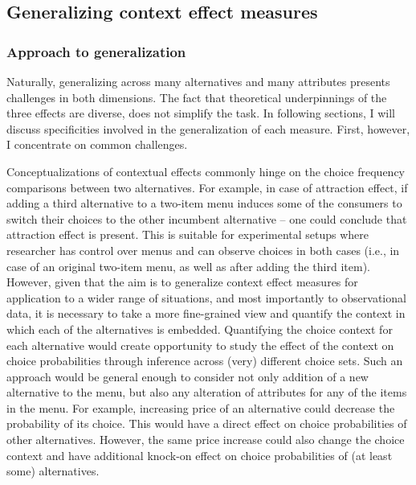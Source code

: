 \documentclass[a4paper,12pt]{article}
\begin{document}
\subsection{Generalizing context effect measures}
\subsubsection{Approach to generalization}

Naturally, generalizing across many alternatives and many attributes presents challenges in both dimensions. The fact that theoretical underpinnings of the three effects are diverse, does not simplify the task. In following sections, I will discuss specificities involved in the generalization of each measure. First, however, I concentrate on common challenges.

Conceptualizations of contextual effects commonly hinge on the choice frequency comparisons between two alternatives. For example, in case of attraction effect, if adding a third alternative to a two-item menu induces some of the consumers to switch their choices to the other incumbent alternative – one could conclude that attraction effect is present. This is suitable for experimental setups where researcher has control over menus and can observe choices in both cases (i.e., in case of an original two-item menu, as well as after adding the third item). However, given that the aim is to generalize context effect measures for application to a wider range of situations, and most importantly to observational data, it is necessary to take a more fine-grained view and quantify the context in which each of the alternatives is embedded. Quantifying the choice context for each alternative would create opportunity to study the effect of the context on choice probabilities through inference across (very) different choice sets. Such an approach would be general enough to consider not only addition of a new alternative to the menu, but also any alteration of attributes for any of the items in the menu. For example, increasing price of an alternative could decrease the probability of its choice. This would have a direct effect on choice probabilities of other alternatives. However, the same price increase could also change the choice context and have additional knock-on effect on choice probabilities of (at least some) alternatives.
\end{document}
